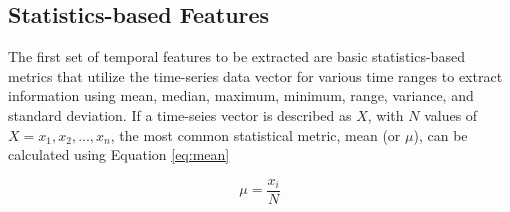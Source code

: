 \subsection{Statistics-based Features}
\label{sec:statisticsfeatures}

The first set of temporal features to be extracted are basic statistics-based metrics that utilize the time-series data vector for various time ranges to extract information using mean, median, maximum, minimum, range, variance, and standard deviation. If a time-seies vector is described as $X$, with $N$ values of $X = {x_1, x_2,...,x_n}$, the most common statistical metric, mean (or $\mu$), can be calculated using Equation \ref{eq:mean}

\begin{equation}
\mu = \frac{x_i}{N}
\label{eq:mean}
\end{equation}
